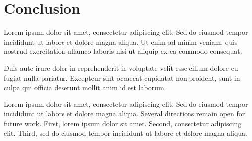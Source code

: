 \section{Conclusion}\label{sec:conclusion}


Lorem ipsum dolor sit amet, consectetur adipiscing elit. Sed do eiusmod tempor
incididunt ut labore et dolore magna aliqua. Ut enim ad minim veniam, quis
nostrud exercitation ullamco laboris nisi ut aliquip ex ea commodo consequat.

Duis aute irure dolor in reprehenderit in voluptate velit esse cillum dolore eu
fugiat nulla pariatur. Excepteur sint occaecat cupidatat non proident, sunt in
culpa qui officia deserunt mollit anim id est laborum.

Lorem ipsum dolor sit amet, consectetur adipiscing elit. Sed do eiusmod tempor
incididunt ut labore et dolore magna aliqua. Several directions remain open for
future work. First, lorem ipsum dolor sit amet. Second, consectetur adipiscing
elit. Third, sed do eiusmod tempor incididunt ut labore et dolore magna aliqua.
